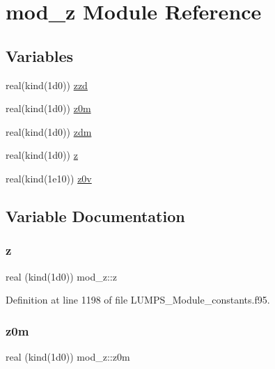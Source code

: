 \hypertarget{namespacemod__z}{}\section{mod\+\_\+z Module Reference}
\label{namespacemod__z}
\subsection*{Variables}
\begin{DoxyCompactItemize}
\item 
real(kind(1d0)) \hyperlink{namespacemod__z_ac1314dbe1ed7b4c92c501ced67f725c3}{zzd}
\item 
real(kind(1d0)) \hyperlink{namespacemod__z_afd15a8bab419b8b576ccd3fa639d546f}{z0m}
\item 
real(kind(1d0)) \hyperlink{namespacemod__z_a85318ac2a4eb1313fc10432ff860214e}{zdm}
\item 
real(kind(1d0)) \hyperlink{namespacemod__z_a64eb68f633930155dd1415ee7f3e9d5c}{z}
\item 
real(kind(1e10)) \hyperlink{namespacemod__z_a62697e7e7a6c6a41258386a4a26ec1a7}{z0v}
\end{DoxyCompactItemize}


\subsection{Variable Documentation}
\mbox{\label{namespacemod__z_a64eb68f633930155dd1415ee7f3e9d5c}} 
\subsubsection{\texorpdfstring{z}{z}}
{\footnotesize\ttfamily real (kind(1d0)) mod\+\_\+z\+::z}



Definition at line 1198 of file L\+U\+M\+P\+S\+\_\+\+Module\+\_\+constants.\+f95.

\mbox{\label{namespacemod__z_afd15a8bab419b8b576ccd3fa639d546f}} 
\subsubsection{\texorpdfstring{z0m}{z0m}}
{\footnotesize\ttfamily real (kind(1d0)) mod\+\_\+z\+::z0m}




